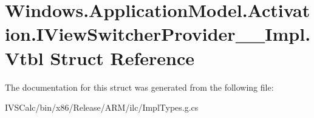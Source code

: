 \hypertarget{struct_windows_1_1_application_model_1_1_activation_1_1_i_view_switcher_provider_____impl_1_1_vtbl}{}\section{Windows.\+Application\+Model.\+Activation.\+I\+View\+Switcher\+Provider\+\_\+\+\_\+\+Impl.\+Vtbl Struct Reference}
\label{struct_windows_1_1_application_model_1_1_activation_1_1_i_view_switcher_provider_____impl_1_1_vtbl}


The documentation for this struct was generated from the following file\+:\begin{DoxyCompactItemize}
\item 
I\+V\+S\+Calc/bin/x86/\+Release/\+A\+R\+M/ilc/Impl\+Types.\+g.\+cs\end{DoxyCompactItemize}
